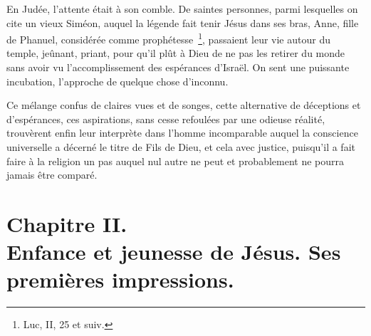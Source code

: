 \documentclass[french,twoside]{book} %
\newcommand\chapteropen{} %
\newcommand\chapterclose{} %
\begin{document}
En Judée, l’attente était à son comble. De saintes personnes, parmi lesquelles on cite un vieux Siméon, auquel la légende fait tenir Jésus dans ses bras, Anne, fille de Phanuel, considérée comme prophétesse \footnote{Luc, II, 25 et suiv.}, passaient leur vie autour du temple, jeûnant, priant, pour qu’il plût à Dieu de ne pas les retirer du monde sans avoir vu l’accomplissement des espérances d’Israël. On sent une puissante incubation, l’approche de quelque chose d’inconnu.\par
Ce mélange confus de claires vues et de songes, cette alternative de déceptions et d’espérances, ces aspirations, sans cesse refoulées par une odieuse réalité, trouvèrent enfin leur interprète dans l’homme incomparable auquel la conscience universelle a décerné le titre de Fils de Dieu, et cela avec justice, puisqu’il a fait faire à la religion un pas auquel nul autre ne peut et probablement ne pourra jamais être comparé.
\chapterclose


\chapteropen
\chapter[{Chapitre II. Enfance et jeunesse de Jésus. Ses premières impressions.}]{Chapitre II. \\
Enfance et jeunesse de Jésus. Ses premières impressions.}\renewcommand{\leftmark}{Chapitre II. \\
Enfance et jeunesse de Jésus. Ses premières impressions.}
\end{document}
